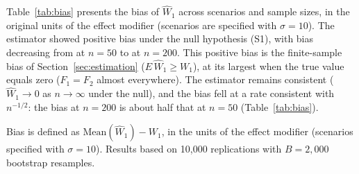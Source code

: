 \documentclass[AMA,Times1COL]{WileyNJDv5}
\begin{document}
Table~\ref{tab:bias} presents the bias of $\widehat{W}_1$ across scenarios and sample sizes, in the original units of the effect modifier (scenarios are specified with $\sigma = 10$). The estimator showed positive bias under the null hypothesis (S1), with bias decreasing from  at $n=50$ to  at $n=200$. This positive bias is the finite-sample bias of Section~\ref{sec:estimation} ($E\,\widehat{W}_1 \geq W_1$), at its largest when the true value equals zero ($F_1 = F_2$ almost everywhere). The estimator remains consistent ($\widehat{W}_1 \to 0$ as $n \to \infty$ under the null), and the bias fell at a rate consistent with $n^{-1/2}$: the bias at $n = 200$ is about half that at $n = 50$ (Table~\ref{tab:bias}).

\begin{table}[ht]
\centering
\caption{Bias of $\widehat{W}_1$ by scenario and sample size, in the original units of the effect modifier.\label{tab:bias}}
\begin{tablenotes}
\item Bias is defined as $\text{Mean}(\widehat{W}_1) - W_1$, in the units of the effect modifier (scenarios specified with $\sigma = 10$). Results based on 10{,}000 replications with $B = 2{,}000$ bootstrap resamples.
\end{tablenotes}
\end{table}
\end{document}
